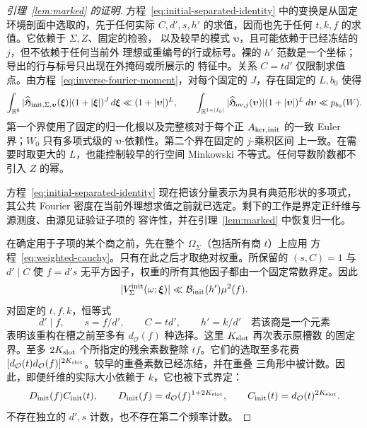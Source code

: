 \documentclass[11pt,a4paper]{article}
\numberwithin{equation}{section}
\numberwithin{figure}{section}
\theoremstyle{definition}
\theoremstyle{remark}
\begin{document}
\begin{proof}[引理~\ref{lem:marked} 的证明]
方程~\eqref{eq:initial-separated-identity} 中的变换是从固定环境剖面中选取的，先于任何实际
\(C,d',s,h'\) 的求值，因而也先于任何 \(t,k,f\) 的求值。它依赖于 \(\Sigma,Z\)、固定的检验，
以及较早的模式 \(\boldsymbol\upsilon\)，且可能依赖于已经冻结的 \(j\)，但不依赖于任何当前外
理想或重编号的行或标号。裸的 \(h'\) 范数是一个坐标；导出的行与标号只出现在外掩码或所展示的
特征中。关系 \(C=td'\) 仅限制求值点。由方程~\eqref{eq:inverse-fourier-moment}，对每个固定的
\(J\)，存在固定的 \(L,b_0\) 使得
\[
 \int_{\mathbb R^6}
 |\widehat{\mathfrak H}_{{\rm init},\Sigma,\boldsymbol\upsilon}
       (\boldsymbol\xi)|(1+|\boldsymbol\xi|)^J\,d\boldsymbol\xi
 \ll (1+|\boldsymbol\upsilon|)^L,\qquad
 \int_{\mathbb R^{1+|I_0|}}|\widehat{\mathfrak H}_{{\rm ov},j}(\boldsymbol\upsilon)|
       (1+|\boldsymbol\upsilon|)^L\,d\boldsymbol\upsilon
 \ll p_{b_0}(W).
\]
第一个界使用了固定的归一化根以及完整核对于每个正 \(A_{{\rm ker},{\rm init}}\) 的一致
Euler 界；\(W_0\) 只有多项式级的 \(\boldsymbol\upsilon\)-依赖性。第二个界在固定的 \(j\)-乘积区间
上一致。在需要时取更大的 \(L\)，也能控制较早的行空间 Minkowski 不等式。任何导数阶数都不
引入 \(Z\) 的幂。

方程~\eqref{eq:initial-separated-identity} 现在把该分量表示为具有典范形状的多项式，其公共
Fourier 密度在当前外理想求值之前就已选定。剩下的工作是界定正纤维与源测度、由源见证验证子项的
容许性，并在引理~\ref{lem:marked} 中恢复归一化。

在确定用于子项的某个商之前，先在整个 \(\Omega_\Sigma\)（包括所有商 \(t\)）上应用
方程~\eqref{eq:weighted-cauchy}。只有在此之后才取绝对权重。所保留的 \((s,C)=1\) 与
\(d'\mid C\) 使 \(f=d's\) 无平方因子，权重的所有其他因子都由一个固定常数界定。因此
\[
 |V_\Sigma^{\rm init}(\omega;\boldsymbol\xi)|
 \ll\mathcal B_{\rm init}(h')\mu^2(f).
\]
对固定的 \(t,f,k\)，恒等式
\[
 d'\mid f,\qquad s=f/d',\qquad C=td',\qquad h'=k/d'
       \quad\text{若该商是一个元素}
\]
表明该重构在槽之前至多有 \(d_{\mathcal O}(f)\) 种选择。这里 \(K_{\rm slot}\) 再次表示原槽数
的固定界。至多 \(2K_{\rm slot}\) 个所指定的残余素数整除 \(tf\)。它们的选取至多花费
\([d_{\mathcal O}(t)d_{\mathcal O}(f)]^{2K_{\rm slot}}\)。较早的重叠素数已经冻结，并在重叠
三角形中被计数。因此，即便纤维的实际大小依赖于 \(k\)，它也被下式界定：
\begin{equation}\label{eq:initial-fibre}
 D_{\rm init}(f)C_{\rm init}(t),\qquad
 D_{\rm init}(f)=d_{\mathcal O}(f)^{1+2K_{\rm slot}},\qquad
 C_{\rm init}(t)=d_{\mathcal O}(t)^{2K_{\rm slot}}.
\end{equation}
不存在独立的 \(d',s\) 计数，也不存在第二个频率计数。


\end{proof}
\end{document}
